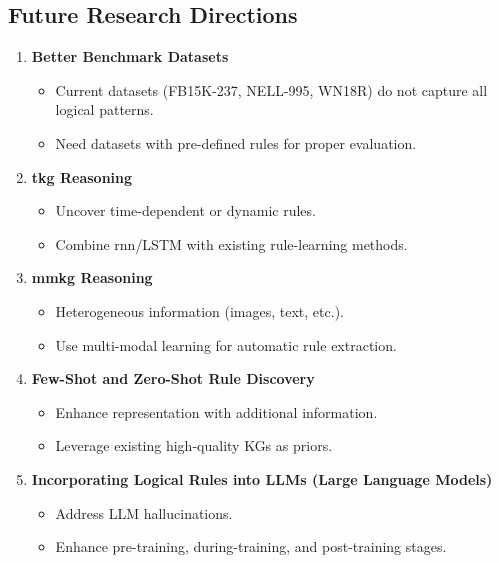 \subsection*{Future Research Directions}
\begin{enumerate}
    \item \textbf{Better Benchmark Datasets}
    \begin{itemize}
        \item Current datasets (FB15K-237, NELL-995, WN18R) do not capture all logical patterns.
        \item Need datasets with pre-defined rules for proper evaluation.
    \end{itemize}

    \item \textbf{\gls{tkg} Reasoning}
    \begin{itemize}
        \item Uncover time-dependent or dynamic rules.
        \item Combine \gls{rnn}/LSTM with existing rule-learning methods.
    \end{itemize}

    \item \textbf{\gls{mmkg} Reasoning}
    \begin{itemize}
        \item Heterogeneous information (images, text, etc.).
        \item Use multi-modal learning for automatic rule extraction.
    \end{itemize}

    \item \textbf{Few-Shot and Zero-Shot Rule Discovery}
    \begin{itemize}
        \item Enhance representation with additional information.
        \item Leverage existing high-quality KGs as priors.
    \end{itemize}

    \item \textbf{Incorporating Logical Rules into LLMs (Large Language Models)}
    \begin{itemize}
        \item Address LLM hallucinations.
        \item Enhance pre-training, during-training, and post-training stages.
    \end{itemize}
\end{enumerate}

